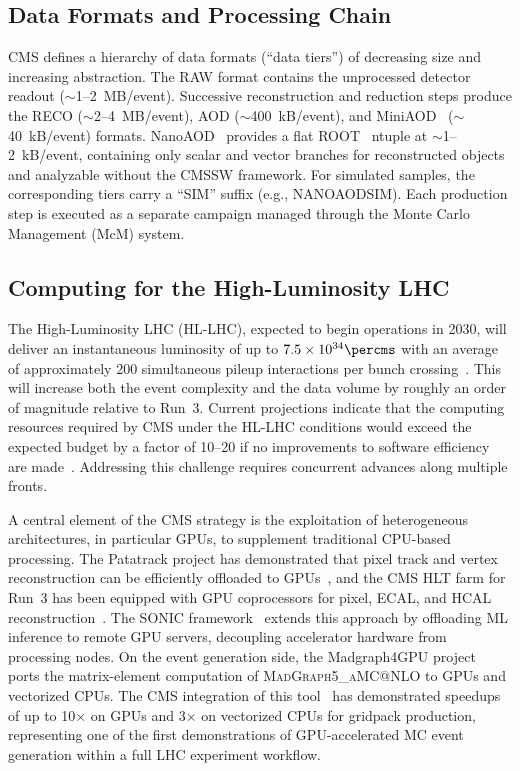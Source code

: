 \subsection*{Data Formats and Processing Chain}
\label{sec:datatiers}

CMS defines a hierarchy of data formats (``data tiers'') of decreasing size and increasing abstraction. The RAW format contains the unprocessed detector readout ($\sim$1--2~MB/event). Successive reconstruction and reduction steps produce the RECO ($\sim$2--4~MB/event), AOD ($\sim$400~kB/event), and MiniAOD~\cite{Petrucciani:2015gjw} ($\sim$40~kB/event) formats. NanoAOD~\cite{Rizzi:2019epjconf} provides a flat \textsc{ROOT}~\cite{Brun:1997pa} ntuple at $\sim$1--2~kB/event, containing only scalar and vector branches for reconstructed objects and analyzable without the \textsc{CMSSW} framework. For simulated samples, the corresponding tiers carry a ``SIM'' suffix (e.g., NANOAODSIM). Each production step is executed as a separate campaign managed through the Monte Carlo Management (McM) system.

\subsection*{Computing for the High-Luminosity LHC}
\label{sec:hllhc_computing}

The High-Luminosity LHC (HL-LHC), expected to begin operations in 2030, will deliver an instantaneous luminosity of up to $7.5 \times 10^{34}\percms$ with an average of approximately 200 simultaneous pileup interactions per bunch crossing~\cite{CMS:2025phase2}. This will increase both the event complexity and the data volume by roughly an order of magnitude relative to Run~3. Current projections indicate that the computing resources required by CMS under the HL-LHC conditions would exceed the expected budget by a factor of 10--20 if no improvements to software efficiency are made~\cite{CMS:2022note008, Albrecht:2018hsf}. Addressing this challenge requires concurrent advances along multiple fronts.

A central element of the CMS strategy is the exploitation of heterogeneous architectures, in particular GPUs, to supplement traditional CPU-based processing. The Patatrack project has demonstrated that pixel track and vertex reconstruction can be efficiently offloaded to GPUs~\cite{Bocci:2020patatrack}, and the CMS HLT farm for Run~3 has been equipped with GPU coprocessors for pixel, ECAL, and HCAL reconstruction~\cite{CMS:2024run3dev}. The SONIC framework~\cite{CMS:2024sonic} extends this approach by offloading ML inference to remote GPU servers, decoupling accelerator hardware from processing nodes. On the event generation side, the Madgraph4GPU project~\cite{Valassi:2025cudacpp, Hageboeck:2023mg4gpu} ports the matrix-element computation of \textsc{MadGraph5\_aMC@NLO} to GPUs and vectorized CPUs. The CMS integration of this tool~\cite{Choi:2025mg4gpu} has demonstrated speedups of up to 10$\times$ on GPUs and 3$\times$ on vectorized CPUs for gridpack production, representing one of the first demonstrations of GPU-accelerated MC event generation within a full LHC experiment workflow.

